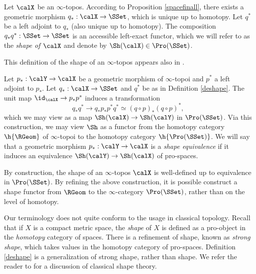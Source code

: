 \begin{definition}\label{deshape}
Let $\calX$ be an $\infty$-topos. According to Proposition \ref{spacefinall}, there exists a
geometric morphism $q_{\ast}: \calX \rightarrow \SSet$, which is unique up to homotopy.
Let $q^{\ast}$ be a left adjoint to $q_{\ast}$ (also unique up to homotopy).
The composition $q_{\ast} q^{\ast}: \SSet \rightarrow \SSet$ is an accessible left-exact functor, which we will refer to as the {\it shape of $\calX$} and denote by $\Sh(\calX) \in \Pro(\SSet)$.
\end{definition}

\begin{remark}
This definition of the shape of an $\infty$-topos appears also in \cite{toen}.
\end{remark}

\begin{remark}
Let $p_{\ast}: \calY \rightarrow \calX$ be a geometric morphism of $\infty$-topoi and $p^{\ast}$ a left adjoint to $p_{\ast}$. Let $q_{\ast}: \calX \rightarrow \SSet$ and $q^{\ast}$ be as in Definition \ref{deshape}. The unit map $\id_{\calX} \rightarrow p_{\ast} p^{\ast}$ induces a transformation 
$$q_{\ast} q^{\ast} \rightarrow q_{\ast} p_{\ast} p^{\ast} q^{\ast} \simeq (q \circ p)_{\ast} (q \circ p)^{\ast},$$
which we may view as a map $\Sh(\calX) \rightarrow \Sh(\calY)$ in $\Pro(\SSet)$. Via this construction, we may view $\Sh$ as a functor from the homotopy category $\h{\RGeom}$ of $\infty$-topoi to the homotopy category $\h{\Pro(\SSet)}$. We will say that a geometric morphism $p_{\ast}: \calY \rightarrow \calX$ is a {\it shape equivalence} if it induces an equivalence $\Sh(\calY) \rightarrow \Sh(\calX)$ of pro-spaces.
\end{remark}

\begin{remark}
By construction, the shape of an $\infty$-topos $\calX$ is well-defined up to equivalence
in $\Pro(\SSet)$. By refining the above construction, it is possible construct a shape functor from $\RGeom$ to the $\infty$-category $\Pro(\SSet)$, rather than on the level of homotopy.
\end{remark}

\begin{remark}\label{struke}
Our terminology does not quite conform to the usage in classical topology. Recall that if $X$ is a compact metric space, the {\it shape} of $X$ is defined as a pro-object in the {\em homotopy} category of spaces. There is a refinement of shape, known as {\it strong shape}, which takes values in the homotopy category of pro-spaces. Definition \ref{deshape} is a generalization of strong shape, rather than shape. We refer the reader to \cite{shapetheory} for a discussion of classical shape theory.
\end{remark}

